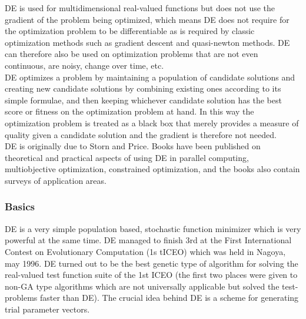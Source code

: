 \documentclass[11pt, a4paper]{report}
\begin{document}
DE is used for multidimensional real-valued functions but does not use the gradient of the problem being optimized, which means DE does not require for the optimization problem to be differentiable as is required by classic optimization methods such as gradient descent and quasi-newton methods. DE can therefore also be used on optimization problems that are not even continuous, are noisy, change over time, etc. \\

DE optimizes a problem by maintaining a population of candidate solutions and creating new candidate solutions by combining existing ones according to its simple formulae, and then keeping whichever candidate solution has the best score or fitness on the optimization problem at hand. In this way the optimization problem is treated as a black box that merely provides a measure of quality given a candidate solution and the gradient is therefore not needed. \\

DE is originally due to Storn and Price. Books have been published on theoretical and practical aspects of using DE in parallel computing, multiobjective optimization, constrained optimization, and the books also contain surveys of application areas. \cite{wiki:de}

\subsubsection{Basics}
DE is a very simple population based, stochastic function minimizer which is very powerful at the same time. DE managed to finish 3rd at the First International Contest on Evolutionary Computation (1s tICEO) which was held in Nagoya, may 1996. DE turned out to be the best genetic type of algorithm for solving the real-valued test function suite of the 1st ICEO (the first two places were given to non-GA type algorithms which are not universally applicable but solved the test-problems faster than DE). The crucial idea behind DE is a scheme for generating trial parameter vectors. \\
\end{document}
